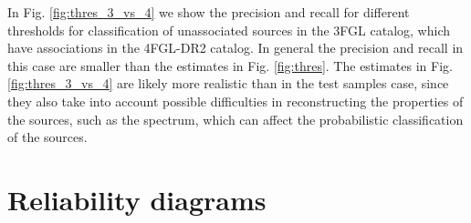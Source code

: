 \documentclass[referee]{aa} %
\newcommand{\lb}{\label}
\begin{document}
\begin{appendix}
In Fig. \ref{fig:thres_3_vs_4} we show the precision and recall for different thresholds for classification of unassociated sources in the 3FGL catalog, which have associations in the 4FGL-DR2 catalog. In general the precision and recall in this case are smaller than the estimates in Fig. \ref{fig:thres}.  The estimates in Fig. \ref{fig:thres_3_vs_4} are likely more realistic than in the test samples case, since they also take into account possible difficulties in reconstructing the properties of the sources, such as the spectrum, which can affect the probabilistic classification of the sources.
\newpage
\section{Reliability diagrams}
\lb{sec:reliability}



\end{appendix}
\end{document}
